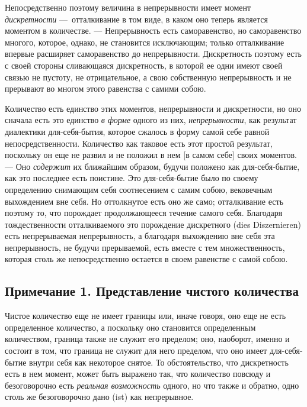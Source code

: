 Непосредственно поэтому величина в непрерывности имеет момент
{\em дискретности} —~отталкивание в том виде, в каком
оно теперь является моментом в количестве. — Непрерывность есть
саморавенство, но саморавенство многого, которое, однако, не становится
исключающим; только отталкивание впервые расширяет саморавенство до
непрерывности. Дискретность поэтому есть с своей стороны сливающаяся
дискретность, в которой ее одни имеют своей связью не пустоту, не
отрицательное, а свою собственную непрерывность и не прерывают во многом
этого равенства с самими собою.

Количество есть единство этих моментов, непрерывности и дискретности, но оно
сначала есть это единство {\em в форме} одного из них,
{\em непрерывности}, как результат диалектики
для-себя-бытия, которое сжалось в форму самой себе равной
непосредственности. Количество как таковое есть этот простой результат,
поскольку он еще не развил и не положил в нем [в самом себе] своих
моментов. — Оно {\em содержит} их ближайшим образом,
будучи положено как для-себя-бытие, как это последнее есть поистине. Это
для-себя-бытие было по своему определению снимающим себя соотнесением с
самим собою, вековечным выхождением вне себя. Но оттолкнутое есть оно же
само; отталкивание есть поэтому то, что порождает продолжающееся течение
самого себя. Благодаря тождественности отталкиваемого это порождение
дискретного (dies Diszernieren) есть непрерываемая непрерывность, а
благодаря выхождению вне себя эта непрерывность, не будучи прерываемой,
есть вместе с тем множественность, которая столь же непосредственно
остается в своем равенстве с самой собою.

\subsection*{Примечание 1. Представление чистого количества}

Чистое количество еще не имеет границы или, иначе говоря, оно еще не есть
определенное количество, а поскольку оно становится определенным
количеством, граница также не служит его пределом; оно, наоборот, именно и
состоит в том, что граница не служит для него пределом, что оно имеет
для-себя-бытие внутри себя как некоторое снятое. То обстоятельство, что
дискретность есть в нем момент, может быть выражено так, что количество
повсюду и безоговорочно есть {\em реальная возможность}
одного, но что также и обратно, одно столь же безоговорочно дано (ist) как
непрерывное.

